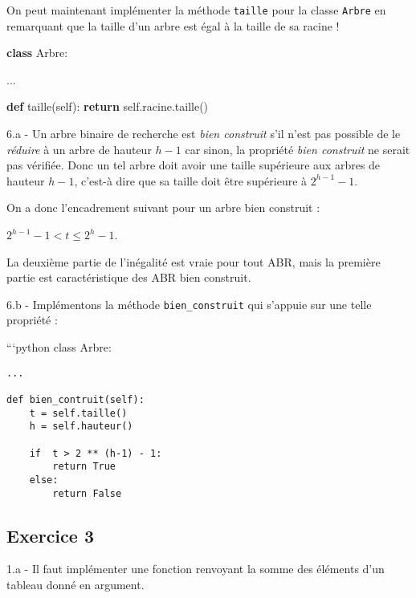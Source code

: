 \documentclass[a4paper,17pt]{extarticle}
\newenvironment{Shaded}{}{}
\newcommand{\KeywordTok}[1]{\textcolor[rgb]{0.00,0.44,0.13}{\textbf{{#1}}}}
\newcommand{\NormalTok}[1]{{#1}}
\newcommand{\VariableTok}[1]{\textcolor[rgb]{0.10,0.09,0.49}{{#1}}}
\newcommand{\ControlFlowTok}[1]{\textcolor[rgb]{0.00,0.44,0.13}{\textbf{{#1}}}}
\begin{document}
On peut maintenant implémenter la méthode \texttt{taille} pour la classe
\texttt{Arbre} en remarquant que la taille d'un arbre est égal à la
taille de sa racine !

\begin{Shaded}
\begin{Highlighting}[]
\KeywordTok{class}\NormalTok{ Arbre:}
    
\NormalTok{    ...}

    \KeywordTok{def}\NormalTok{ taille(}\VariableTok{self}\NormalTok{):}
        \ControlFlowTok{return} \VariableTok{self}\NormalTok{.racine.taille()}
\end{Highlighting}
\end{Shaded}

    6.a - Un arbre binaire de recherche est \emph{bien construit} s'il n'est
pas possible de le \emph{réduire} à un arbre de hauteur \(h-1\) car
sinon, la propriété \emph{bien construit} ne serait pas vérifiée. Donc
un tel arbre doit avoir une taille supérieure aux arbres de hauteur
\(h-1\), c'est-à dire que sa taille doit être supérieure à
\(2^{h-1} - 1\).

On a donc l'encadrement suivant pour un arbre bien construit :

\(2 ^{h-1} - 1 < t \leq 2^h - 1\).

La deuxième partie de l'inégalité est vraie pour tout ABR, mais la
première partie est caractéristique des ABR bien construit.

    6.b - Implémentons la méthode \texttt{bien\_construit} qui s'appuie sur
une telle propriété :

```python class Arbre:

\begin{verbatim}
...

def bien_contruit(self):
    t = self.taille()
    h = self.hauteur()

    if  t > 2 ** (h-1) - 1:
        return True
    else:
        return False
\end{verbatim}

    \hypertarget{exercice-3}{%
\subsection{Exercice 3}\label{exercice-3}}

    1.a - Il faut implémenter une fonction renvoyant la somme des éléments
d'un tableau donné en argument.
\end{document}

